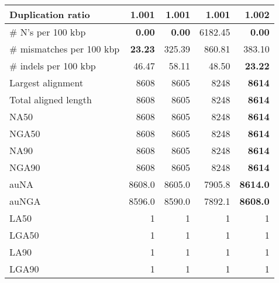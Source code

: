 \documentclass[12pt,a4paper]{article}
\begin{document}
\begin{table}[ht]
\begin{center}
\begin{tabular}{|l*{4}{|r}|}
Duplication ratio & {\bf 1.001} & {\bf 1.001} & {\bf 1.001} & 1.002 \\ \hline
\# N's per 100 kbp & {\bf 0.00} & {\bf 0.00} & 6182.45 & {\bf 0.00} \\ \hline
\# mismatches per 100 kbp & {\bf 23.23} & 325.39 & 860.81 & 383.10 \\ \hline
\# indels per 100 kbp & 46.47 & 58.11 & 48.50 & {\bf 23.22} \\ \hline
Largest alignment & 8608 & 8605 & 8248 & {\bf 8614} \\ \hline
Total aligned length & 8608 & 8605 & 8248 & {\bf 8614} \\ \hline
NA50 & 8608 & 8605 & 8248 & {\bf 8614} \\ \hline
NGA50 & 8608 & 8605 & 8248 & {\bf 8614} \\ \hline
NA90 & 8608 & 8605 & 8248 & {\bf 8614} \\ \hline
NGA90 & 8608 & 8605 & 8248 & {\bf 8614} \\ \hline
auNA & 8608.0 & 8605.0 & 7905.8 & {\bf 8614.0} \\ \hline
auNGA & 8596.0 & 8590.0 & 7892.1 & {\bf 8608.0} \\ \hline
LA50 & 1 & 1 & 1 & 1 \\ \hline
LGA50 & 1 & 1 & 1 & 1 \\ \hline
LA90 & 1 & 1 & 1 & 1 \\ \hline
LGA90 & 1 & 1 & 1 & 1 \\ \hline
\end{tabular}
\end{center}
\end{table}
\end{document}
